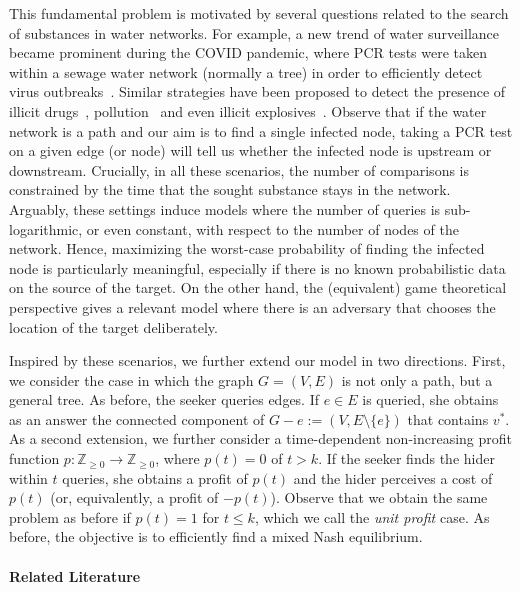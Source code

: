 \documentclass[11pt]{article}
\newcommand\+{\mkern2mu}
\begin{document}
This fundamental problem is motivated by several questions related to the search of substances in water networks. For example, a new trend of water surveillance became prominent during the COVID pandemic, where PCR tests were taken within a sewage water network (normally a tree) in order to efficiently detect virus outbreaks~\cite{ahmed_first_2020,PNAS2024,domokos_identification_2022,larson_sampling_2020,nourinejad_placing_2021,doi:10.5864/d2021-015}. 
Similar strategies have been proposed to detect the presence of illicit drugs~\cite{Sulej-SuchomskaEtAl2020}, pollution~\cite{cristo_pollution_2008} and even illicit explosives~\cite{EMPHASIS}. Observe that if the water network is a path and our aim is to find a single infected node, taking a PCR test on a given edge (or node) will tell us whether the infected node is upstream or downstream. Crucially, in all these scenarios, the number of comparisons is constrained by the time that the sought substance stays in the network. Arguably, these settings induce models where the number of queries is sub-logarithmic, or even constant, with respect to the number of nodes of the network. Hence, maximizing the worst-case probability of finding the infected node is particularly meaningful, especially if there is no known probabilistic data on the source of the target. On the other hand, the (equivalent) game theoretical perspective gives a relevant model where there is an adversary that chooses the location of the target deliberately.

Inspired by these scenarios, we further extend our model in two directions. First, we consider the case in which the graph $G=(V,E)$ is not only a path, but a general tree. As before, the seeker queries edges. If $e\in E$ is queried, she obtains as an answer the connected component of $G-e:=(V,E\setminus\{e\})$ that contains $v^*$. 
As a second extension, we further consider a time-dependent non-increasing profit function $p:\mathbb{Z}_{\ge 0}\rightarrow \mathbb{Z}_{\ge 0}$, where $p(t)=0$ of $t>k$. If the seeker finds the hider within $t$ queries, she obtains a profit of $p(t)$ and the hider perceives a cost of $p(t)$ (or, equivalently, a profit of $-p(t)$). Observe that we obtain the same problem as before if
$p(t)= 1$ for $t\le k$, which we call the \emph{unit profit} case. As before, the objective is to efficiently find a mixed Nash equilibrium.   


\paragraph*{Related Literature} 
\end{document}
